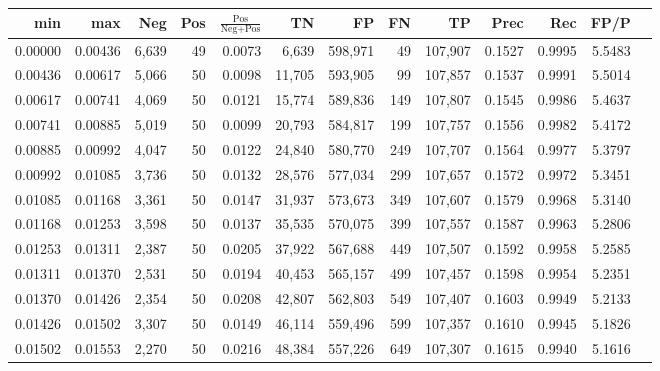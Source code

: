 \begin{tabular}{rrrrrrrrrrrrr}
\toprule
    min &     max &   Neg & Pos & $\frac{\text{Pos}}{\text{Neg}+\text{Pos}}$ &      TN &      FP &      FN &      TP &   Prec &    Rec &   FP/P \\
\midrule
0.00000 & 0.00436 & 6,639 &  49 &                                     0.0073 &   6,639 & 598,971 &      49 & 107,907 & 0.1527 & 0.9995 & 5.5483 \\
0.00436 & 0.00617 & 5,066 &  50 &                                     0.0098 &  11,705 & 593,905 &      99 & 107,857 & 0.1537 & 0.9991 & 5.5014 \\
0.00617 & 0.00741 & 4,069 &  50 &                                     0.0121 &  15,774 & 589,836 &     149 & 107,807 & 0.1545 & 0.9986 & 5.4637 \\
0.00741 & 0.00885 & 5,019 &  50 &                                     0.0099 &  20,793 & 584,817 &     199 & 107,757 & 0.1556 & 0.9982 & 5.4172 \\
0.00885 & 0.00992 & 4,047 &  50 &                                     0.0122 &  24,840 & 580,770 &     249 & 107,707 & 0.1564 & 0.9977 & 5.3797 \\
0.00992 & 0.01085 & 3,736 &  50 &                                     0.0132 &  28,576 & 577,034 &     299 & 107,657 & 0.1572 & 0.9972 & 5.3451 \\
0.01085 & 0.01168 & 3,361 &  50 &                                     0.0147 &  31,937 & 573,673 &     349 & 107,607 & 0.1579 & 0.9968 & 5.3140 \\
0.01168 & 0.01253 & 3,598 &  50 &                                     0.0137 &  35,535 & 570,075 &     399 & 107,557 & 0.1587 & 0.9963 & 5.2806 \\
0.01253 & 0.01311 & 2,387 &  50 &                                     0.0205 &  37,922 & 567,688 &     449 & 107,507 & 0.1592 & 0.9958 & 5.2585 \\
0.01311 & 0.01370 & 2,531 &  50 &                                     0.0194 &  40,453 & 565,157 &     499 & 107,457 & 0.1598 & 0.9954 & 5.2351 \\
0.01370 & 0.01426 & 2,354 &  50 &                                     0.0208 &  42,807 & 562,803 &     549 & 107,407 & 0.1603 & 0.9949 & 5.2133 \\
0.01426 & 0.01502 & 3,307 &  50 &                                     0.0149 &  46,114 & 559,496 &     599 & 107,357 & 0.1610 & 0.9945 & 5.1826 \\
0.01502 & 0.01553 & 2,270 &  50 &                                     0.0216 &  48,384 & 557,226 &     649 & 107,307 & 0.1615 & 0.9940 & 5.1616 \\

\end{tabular}
